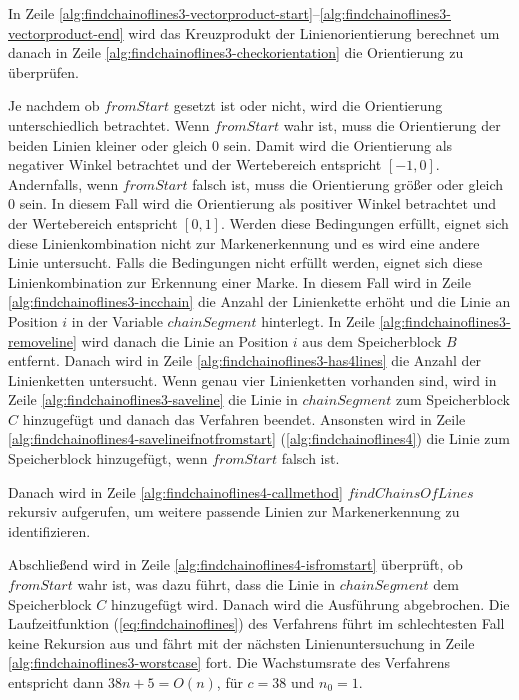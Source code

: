 In Zeile \ref{alg:findchainoflines3-vectorproduct-start}--\ref{alg:findchainoflines3-vectorproduct-end} wird das
 Kreuzprodukt der Linienorientierung berechnet um danach in Zeile \ref{alg:findchainoflines3-checkorientation} die
 Orientierung zu überprüfen.

Je nachdem ob $\mathit{fromStart}$ gesetzt ist oder nicht, wird die Orientierung unterschiedlich betrachtet. Wenn
 $\mathit{fromStart}$ wahr ist, muss die Orientierung der beiden Linien kleiner oder gleich $0$ sein. Damit wird die
 Orientierung als negativer Winkel betrachtet und der Wertebereich entspricht $\left[-1,0\right]$. Andernfalls, wenn
 $\mathit{fromStart}$ falsch ist, muss die Orientierung größer oder gleich $0$ sein. In diesem Fall wird die
 Orientierung als positiver Winkel betrachtet und der Wertebereich entspricht $\left[0,1\right]$. Werden diese
 Bedingungen erfüllt, eignet sich diese Linienkombination nicht zur Markenerkennung und es wird eine andere Linie
 untersucht. Falls die Bedingungen nicht erfüllt werden, eignet sich diese Linienkombination zur Erkennung einer Marke.
 In diesem Fall wird in Zeile \ref{alg:findchainoflines3-incchain} die Anzahl der Linienkette erhöht und die Linie an
 Position $i$ in der Variable $\mathit{chainSegment}$ hinterlegt. In Zeile \ref{alg:findchainoflines3-removeline} wird
 danach die Linie an Position $i$ aus dem Speicherblock $B$ entfernt. Danach wird in Zeile
 \ref{alg:findchainoflines3-has4lines} die Anzahl der Linienketten untersucht. Wenn genau vier Linienketten vorhanden
 sind, wird in Zeile \ref{alg:findchainoflines3-saveline} die Linie in $\mathit{chainSegment}$ zum Speicherblock $C$
 hinzugefügt und danach das Verfahren beendet. Ansonsten wird in Zeile
 \ref{alg:findchainoflines4-savelineifnotfromstart} (\autoref{alg:findchainoflines4}) die Linie zum Speicherblock
 hinzugefügt, wenn $\mathit{fromStart}$ falsch ist.

Danach wird in Zeile \ref{alg:findchainoflines4-callmethod} $\mathit{findChainsOfLines}$ rekursiv aufgerufen, um
 weitere passende Linien zur Markenerkennung zu identifizieren.

Abschließend wird in Zeile \ref{alg:findchainoflines4-isfromstart} überprüft, ob $\mathit{fromStart}$ wahr ist, was
 dazu führt, dass die Linie in $\mathit{chainSegment}$ dem Speicherblock $C$ hinzugefügt wird. Danach wird die
 Ausführung abgebrochen. Die Laufzeitfunktion (\autoref{eq:findchainoflines}) des Verfahrens führt im schlechtesten Fall
 keine Rekursion aus und fährt mit der nächsten Linienuntersuchung in Zeile \ref{alg:findchainoflines3-worstcase} fort.
 Die Wachstumsrate des Verfahrens entspricht dann $38n + 5 = O(n)$, für $c = 38$ und $n_{0} = 1$.


